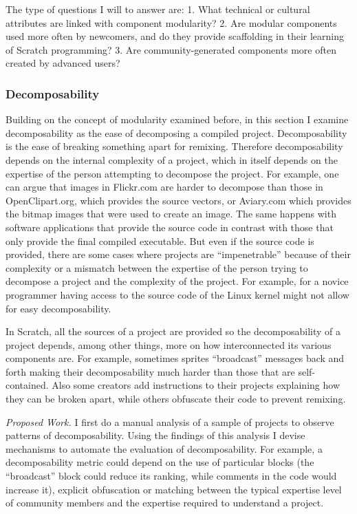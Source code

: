 The type of questions I will to answer are:
1. What technical or cultural attributes are linked with component modularity? 
2. Are modular components used more often by newcomers, and do they provide scaffolding in their learning of Scratch programming?
3. Are community-generated components more often created by advanced users?

\subsubsection{Decomposability}
Building on the concept of modularity examined before, in this section I examine decomposability as the ease of decomposing a compiled project.
Decomposability is the ease of breaking something apart for remixing.
Therefore decomposability depends on the internal complexity of a project, which in itself depends on the expertise of the person attempting to decompose the project.
For example, one can argue that images in Flickr.com are harder to decompose than those in OpenClipart.org, which provides the source vectors, or Aviary.com which provides the bitmap images that were used to create an image.
The same happens with software applications that provide the source code in contrast with those that only provide the final compiled executable.
But even if the source code is provided, there are some cases where projects are ``impenetrable'' because of their complexity or a mismatch between the expertise of the person trying to decompose a project and the complexity of the project. 
For example, for a novice programmer having access to the source code of the Linux kernel might not allow for easy decomposability.

In Scratch, all the sources of a project are provided so the decomposability of a project depends, among other things, more on how interconnected its various components are. 
For example, sometimes sprites ``broadcast'' messages back and forth making their decomposability much harder than those that are self-contained.
Also some creators add instructions to their projects explaining how they can be broken apart, while others obfuscate their code to prevent remixing.

\emph{Proposed Work.}
I first do a manual analysis of a sample of projects to observe patterns of decomposability. 
Using the findings of this analysis I devise mechanisms to automate the evaluation of decomposability. 
For example, a decomposability metric could depend on the use of particular blocks (the ``broadcast'' block could reduce its ranking, while comments in the code would increase it), explicit obfuscation or matching between the typical expertise level of community members and the expertise required to understand a project.

